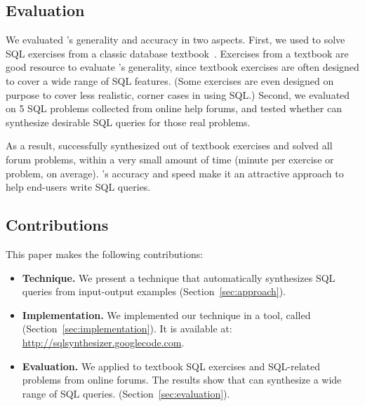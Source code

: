 


\subsection{Evaluation}

We evaluated \ourtool's generality and accuracy
in two aspects. First, we used \ourtool to solve
\exnum SQL exercises from a classic database textbook~\cite{cowbook}. 
Exercises from a textbook are good resource
to evaluate \ourtool's generality, since textbook
exercises are often designed to cover a wide range of SQL features.
(Some exercises are even designed on purpose to cover less realistic,
corner cases in using SQL.)
Second, we evaluated \ourtool on 5 SQL problems collected 
from online help forums, and tested whether
\ourtool can synthesize desirable SQL queries for those
real problems.  

As a result, \ourtool successfully synthesized \solexnum out of \exnum
textbook exercises and solved all \pnum forum problems, within a very
small amount of time (\avgtime minute per exercise or problem, on average).
\ourtool's accuracy and speed make it an attractive
approach to help end-users write SQL queries.

\subsection{Contributions}

This paper makes the following contributions:

\begin{itemize}

\item \textbf{Technique.} We present a technique that automatically
synthesizes SQL queries from input-output examples
(Section~\ref{sec:approach}).

\item \textbf{Implementation.} We implemented our technique in a
tool, called \ourtool (Section~\ref{sec:implementation}). It is
available at: \url{http://sqlsynthesizer.googlecode.com}.

\item \textbf{Evaluation.} We applied \ourtool
to \exnum textbook SQL exercises and \pnum 
SQL-related problems from online forums.
The results show that \ourtool can synthesize
a wide range of SQL queries.
(Section~\ref{sec:evaluation}).
\end{itemize}
